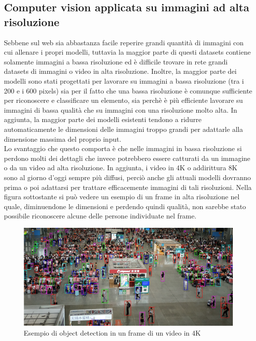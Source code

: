 \subsection{Computer vision applicata su immagini ad alta risoluzione}
Sebbene sul web sia abbastanza facile reperire grandi quantità di immagini con cui allenare i propri modelli, tuttavia la maggior parte di questi datasets contiene solamente immagini a bassa risoluzione ed è difficile trovare in rete grandi datasets di immagini o video in alta risoluzione. Inoltre, la maggior parte dei modelli sono stati progettati per lavorare su immagini a bassa risoluzione (tra i 200 e i 600 pixels) sia per il fatto che una bassa risoluzione è comunque sufficiente per riconoscere e classificare un elemento, sia perchè è più efficiente lavorare su immagini di bassa qualità che su immagini con una risoluzione molto alta\cite{fasthighresolutiondetection}. In aggiunta, la maggior parte dei modelli esistenti tendono a ridurre automaticamente le dimensioni delle immagini troppo grandi per adattarle alla dimensione massima del proprio input.\\
Lo svantaggio che questo comporta è che nelle immagini in bassa risoluzione si perdono molti dei dettagli che invece potrebbero essere catturati da un immagine o da un video ad alta risoluzione. In aggiunta, i video in 4K o addirittura 8K sono al giorno d'oggi sempre più diffusi, perciò anche gli attuali modelli dovranno prima o poi adattarsi per trattare efficacemente immagini di tali risoluzioni. Nella figura sottostante si può vedere un esempio di un frame in alta risoluzione nel quale, diminuendone le dimensioni e perdendo quindi qualità, non sarebbe stato possibile riconoscere alcune delle persone individuate nel frame.
\begin{figure}[H]
	\centering
	\includegraphics[width=0.7\linewidth]{images/immagine-4k.jpg}
	\caption{Esempio di object detection in un frame di un video in 4K}
	\label{Esempio di object detection in un frame di un video in 4K}
\end{figure}
